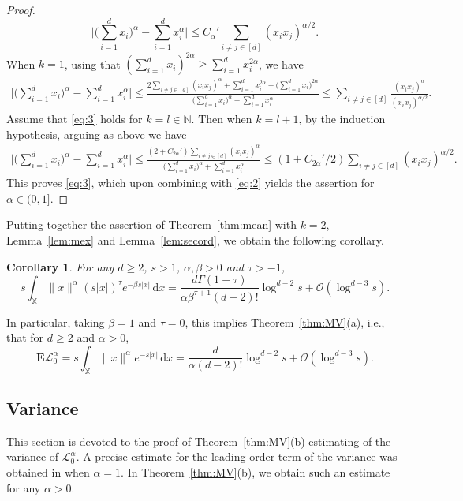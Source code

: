 \documentclass[11pt,reqno]{amsart}
\numberwithin{equation}{section}
\newtheorem{corollary}[theorem]{Corollary}
\theoremstyle{definition}
\newcommand{\E}{\mathbf{E}}
\newcommand{\N}{\mathbb{N}}
\newcommand{\XX}{\mathbb{X}}
\newcommand{\diff}{{\,\mathrm d}}
\begin{document}
\begin{proof}
	\begin{equation}\label{eq:3}
	\Big|\Big(\sum_{i=1}^d x_i\Big)^{\alpha} - \sum_{i=1}^d x_i^\alpha\Big| \le C_\alpha' \sum_{i \not = j \in [d]} (x_ix_j)^{\alpha/2}.
	\end{equation}
	When $k=1$, using that $(\sum_{i=1}^d x_i)^{2\alpha} \ge \sum_{i=1}^d x_i^{2\alpha}$, we have
	\begin{align*}
	\Big|\Big(\sum_{i=1}^d x_i\Big)^{\alpha} - \sum_{i=1}^d x_i^\alpha\Big| \le \frac{2 \sum_{i \not = j \in [d]} (x_i x_j)^\alpha + \sum_{i=1}^d x_i^{2\alpha} - \big(\sum_{i=1}^d x_i\big)^{2\alpha}}{\big(\sum_{i=1}^d x_i\big)^{\alpha} + \sum_{i=1}^d x_i^\alpha} \le \sum_{i \not = j \in [d]} \frac{(x_i x_j)^\alpha}{(x_ix_j)^{\alpha/2}}.
	\end{align*}
	Assume that \eqref{eq:3} holds for $k=l \in \N$. Then when $k=l+1$, by the induction hypothesis, arguing as above we have
	\begin{align*}
	\Big|\Big(\sum_{i=1}^d x_i\Big)^{\alpha} - \sum_{i=1}^d x_i^\alpha\Big| \le \frac{(2+C_{2\alpha}') \sum_{i \not = j \in [d]} (x_i x_j)^\alpha}{\big(\sum_{i=1}^d x_i\big)^{\alpha} + \sum_{i=1}^d x_i^\alpha} \le (1+ C_{2\alpha}'/2) \sum_{i \not = j \in [d]} (x_ix_j)^{\alpha/2}.
	\end{align*}
	This proves \eqref{eq:3}, which upon combining with \eqref{eq:2} yields the assertion for $\alpha \in (0,1]$.
\end{proof}

Putting together the assertion of Theorem~\ref{thm:mean} with $k=2$, Lemma~\ref{lem:mex} and Lemma~\ref{lem:secord}, we obtain the following corollary.

\begin{corollary}\label{cor:1}
	For any $d \ge 2$, $s > 1$, $\alpha, \beta>0$ and $\tau >-1$, 
	$$
	s\int_{\XX} \|x\|^\alpha (s|x|)^\tau e^{-\beta s |x|}\diff x= \frac{d \Gamma(1+\tau)}{\alpha \beta^{\tau+1}(d-2)!} \log^{d-2} s + \mathcal{O}(\log^{d-3} s).
	$$
\end{corollary}

In particular, taking $\beta=1$ and $\tau=0$, this implies Theorem~\ref{thm:MV}(a), i.e., that for $d \ge 2$ and $\alpha>0$,
\begin{equation*} 
\E \mathscr{L}_0^{\alpha} = s\int_{\XX} \|x\|^\alpha e^{-s |x|}\diff x= \frac{d}{\alpha (d-2)!} \log^{d-2} s + \mathcal{O}(\log^{d-3} s).
\end{equation*}



\subsection{Variance} This section is devoted to the proof of Theorem~\ref{thm:MV}(b) estimating of the variance of $\mathscr{L}_0^{\alpha}$. 
A precise estimate for the leading order term of the variance was obtained in \cite{BLP06} when $\alpha=1$. In Theorem~\ref{thm:MV}(b), we obtain such an estimate for any $\alpha>0$. 
\end{document}
